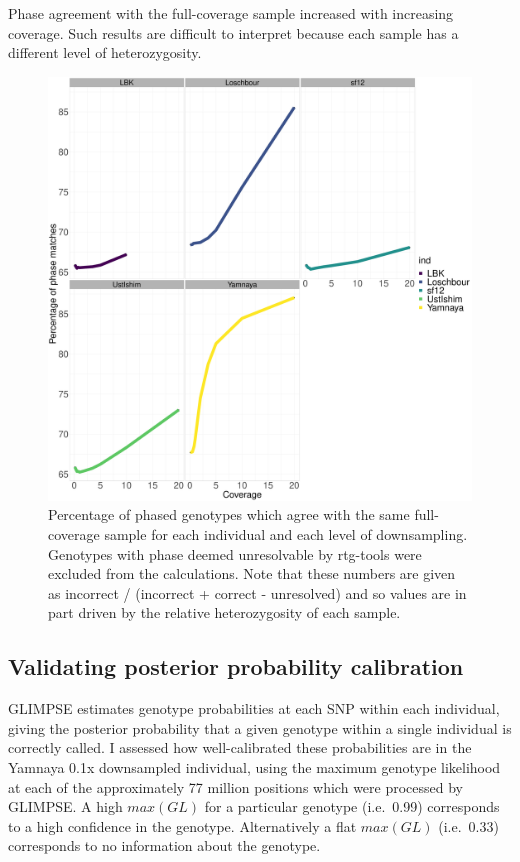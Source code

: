 {Phase agreement with the full-coverage sample increased with increasing coverage. Such results are difficult to interpret because each sample has a different level of heterozygosity. 

\begin{figure}[htp]
    \centering
    \includegraphics[width=1.0\textwidth]{../images/chapter1/phasing_performance_downsampled.pdf}
    \caption{Percentage of phased genotypes which agree with the same full-coverage sample for each individual and each level of downsampling. Genotypes with phase deemed unresolvable by rtg-tools were excluded from the calculations. Note that these numbers are given as incorrect / (incorrect + correct - unresolved) and so values are in part driven by the relative heterozygosity of each sample.}
    \label{fig:phasing_performance_downsampled}
\end{figure}

\subsection{Validating posterior probability calibration}

GLIMPSE estimates genotype probabilities at each SNP within each individual, giving the posterior probability that a given genotype within a single individual is correctly called. I assessed how well-calibrated these probabilities are in the Yamnaya 0.1x downsampled individual, using the maximum genotype likelihood at each of the approximately 77 million positions which were processed by GLIMPSE. A high $max(GL)$ for a particular genotype (i.e.\ 0.99) corresponds to a high confidence in the genotype. Alternatively a flat $max(GL)$ (i.e.\ 0.33) corresponds to no information about the genotype. 

}
